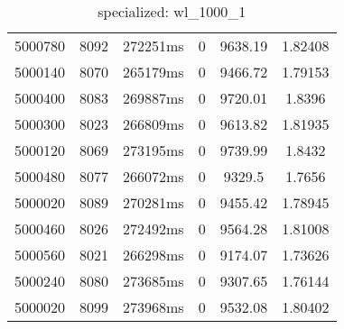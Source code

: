 \documentclass[./main.tex]{subfiles}
\begin{document}
\begin{table}
\begin{tabular}{ c | c | c | c | c | c }
        \hline
        5000780 & 8092 & 272251ms & 0 & 9638.19 & 1.82408 \\
        5000140 & 8070 & 265179ms & 0 & 9466.72 & 1.79153 \\
        5000400 & 8083 & 269887ms & 0 & 9720.01 & 1.8396 \\
        5000300 & 8023 & 266809ms & 0 & 9613.82 & 1.81935 \\
        5000120 & 8069 & 273195ms & 0 & 9739.99 & 1.8432 \\
        5000480 & 8077 & 266072ms & 0 & 9329.5 & 1.7656 \\
        5000020 & 8089 & 270281ms & 0 & 9455.42 & 1.78945 \\
        5000460 & 8026 & 272492ms & 0 & 9564.28 & 1.81008 \\
        5000560 & 8021 & 266298ms & 0 & 9174.07 & 1.73626 \\
        5000240 & 8080 & 273685ms & 0 & 9307.65 & 1.76144 \\
        \rowcolor{lightgray} 5000020 & 8099 & 273968ms & 0 & 9532.08 & 1.80402 \\
    \end{tabular}
    \caption{specialized: wl\_1000\_1}
\end{table}
\end{document}
